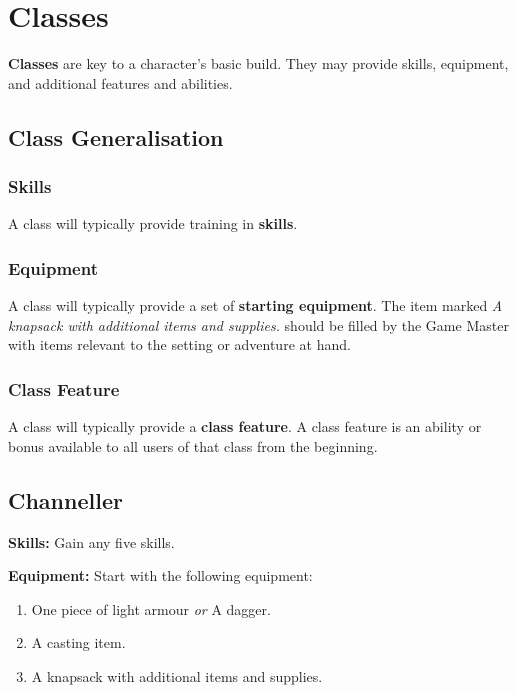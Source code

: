 \documentclass[12pt,]{article}
\providecommand{\tightlist}{%
  \setlength{\itemsep}{0pt}\setlength{\parskip}{0pt}}
\begin{document}
\section{Classes}\label{classes}

\textbf{Classes} are key to a character's basic build. They may provide
skills, equipment, and additional features and abilities.

\subsection{Class Generalisation}\label{class-generalisation}

\subsubsection{Skills}\label{skills-1}

A class will typically provide training in \textbf{skills}.

\subsubsection{Equipment}\label{equipment}

A class will typically provide a set of \textbf{starting equipment}. The
item marked \emph{A knapsack with additional items and supplies.} should
be filled by the Game Master with items relevant to the setting or
adventure at hand.

\subsubsection{Class Feature}\label{class-feature}

A class will typically provide a \textbf{class feature}. A class feature
is an ability or bonus available to all users of that class from the
beginning.

\subsection{Channeller}\label{channeller}

\textbf{Skills:} Gain any five skills.

\textbf{Equipment:} Start with the following equipment:

\begin{enumerate}
\def\labelenumi{\arabic{enumi}.}
\tightlist
\item
  One piece of light armour \emph{or} A dagger.
\item
  A casting item.
\item
  A knapsack with additional items and supplies.
\end{enumerate}
\end{document}
